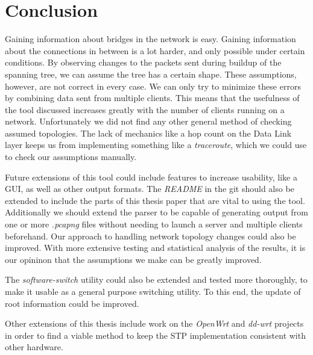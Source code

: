 \chapter{Conclusion}
Gaining information about bridges in the network is easy.
Gaining information about the connections in between is a lot harder, and only possible under certain conditions.
By observing changes to the packets sent during buildup of the spanning tree, we can assume the tree has a certain shape.
These assumptions, however, are not correct in every case.
We can only try to minimize these errors by combining data sent from multiple clients.
This means that the usefulness of the tool discussed increases greatly with the number of clients running on a network.
Unfortunately we did not find any other general method of checking assumed topologies.
The lack of mechanics like a hop count on the Data Link layer keeps us from implementing something like a \textit{traceroute}, which we could use to check our assumptions manually.

Future extensions of this tool could include features to increase usability, like a GUI, as well as other output formats.
The \textit{README} in the git should also be extended to include the parts of this thesis paper that are vital to using the tool.
Additionally we should extend the parser to be capable of generating output from one or more \textit{.pcapng} files without needing to launch a server and multiple clients beforehand.
Our approach to handling network topology changes could also be improved.
With more extensive testing and statistical analysis of the results, it is our opininon that the assumptions we make can be greatly improved.

The \textit{software-switch} utility could also be extended and tested more thoroughly, to make it usable as a general purpose switching utility.
To this end, the update of root information could be improved.

Other extensions of this thesis include work on the \textit{OpenWrt} and \textit{dd-wrt} projects in order to find a viable method to keep the STP implementation consistent with other hardware.
